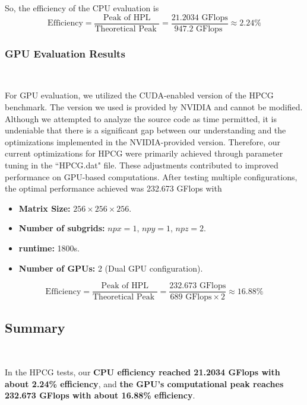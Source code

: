 So, the efficiency of the CPU evaluation is
\begin{equation}
    \text{Efficiency} {=}\frac{\text{Peak of HPL}}{\text{Theoretical Peak }} {=}\frac{\text{21.2034 GFlops}}{\text{947.2 GFlops }}{\approx}2.24\%
\end{equation}

\subsubsection{GPU Evaluation Results}
\ 

For GPU evaluation, we utilized the CUDA-enabled version of the HPCG benchmark.
The version we used is provided by NVIDIA and cannot be modified. Although we attempted to analyze the source code as time permitted, it is undeniable that there is a significant gap between our understanding and the optimizations implemented in the NVIDIA-provided version. 
Therefore, our current optimizations for HPCG were primarily achieved through parameter tuning in the ``HPCG.dat" file. 
These adjustments contributed to improved performance on GPU-based computations.
After testing multiple configurations, the optimal performance achieved was 232.673 GFlops with
\begin{itemize}
    \item \textbf{Matrix Size:} $256{\times}256{\times}256$.
    \item \textbf{Number of subgrids:} $npx{=}1$, $npy{=}1$, $npz{=}2$.
    \item \textbf{runtime:} 1800s.
    \item \textbf{Number of GPUs:} 2 (Dual GPU configuration).
\end{itemize}



\begin{equation}
    \text{Efficiency} {=}\frac{\text{Peak of HPL}}{\text{Theoretical Peak }} {=}\frac{\text{232.673 GFlops}}{\text{689 GFlops}\times 2}{\approx}16.88\%
\end{equation}

\subsection{Summary}
\ 

In the HPCG tests, our \textbf{CPU efficiency reached  21.2034 GFlops with  about 2.24\% efficiency}, and  \textbf{the GPU’s computational peak reaches 232.673 GFlops with about 16.88\% efficiency}.